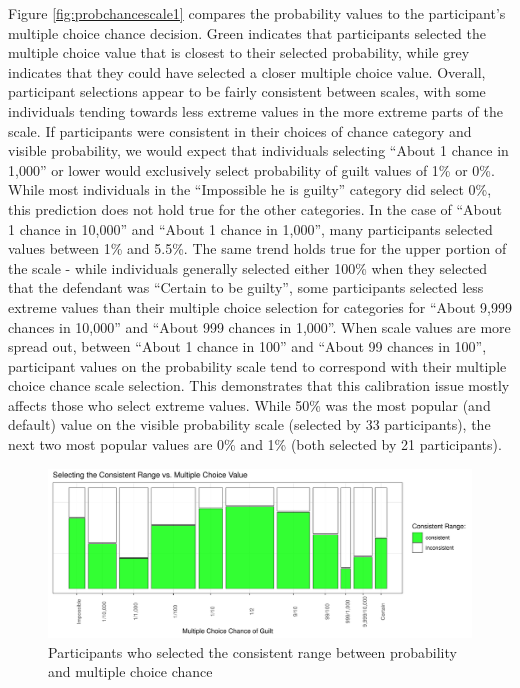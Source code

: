 \documentclass[print]{nuthesis}
\begin{document}
Figure \ref{fig:probchancescale1} compares the probability values to the participant's multiple choice chance decision.
Green indicates that participants selected the multiple choice value that is closest to their selected probability, while grey indicates that they could have selected a closer multiple choice value.
Overall, participant selections appear to be fairly consistent between scales, with some individuals tending towards less extreme values in the more extreme parts of the scale.
If participants were consistent in their choices of chance category and visible probability, we would expect that individuals selecting ``About 1 chance in 1,000'' or lower would exclusively select probability of guilt values of 1\% or 0\%.
While most individuals in the ``Impossible he is guilty'' category did select 0\%, this prediction does not hold true for the other categories.
In the case of ``About 1 chance in 10,000'' and ``About 1 chance in 1,000'', many participants selected values between 1\% and 5.5\%.
The same trend holds true for the upper portion of the scale - while individuals generally selected either 100\% when they selected that the defendant was ``Certain to be guilty'', some participants selected less extreme values than their multiple choice selection for categories for ``About 9,999 chances in 10,000'' and ``About 999 chances in 1,000''.
When scale values are more spread out, between ``About 1 chance in 100'' and ``About 99 chances in 100'', participant values on the probability scale tend to correspond with their multiple choice chance scale selection.
This demonstrates that this calibration issue mostly affects those who select extreme values.
While 50\% was the most popular (and default) value on the visible probability scale (selected by 33 participants), the next two most popular values are 0\% and 1\% (both selected by 21 participants).

\begin{figure}

{\centering \includegraphics[width=\linewidth]{thesis_files/figure-latex/correctprobmosaic-1} 

}

\caption{Participants who selected the consistent range between probability and multiple choice chance}\label{fig:correctprobmosaic}
\end{figure}
\end{document}
